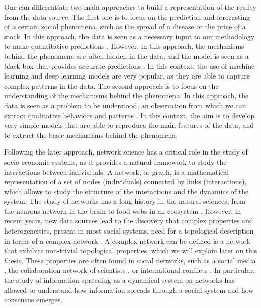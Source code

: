 One can differentiate two main approaches to build a representation of the reality from the data source. The first one is to focus on the prediction and forecasting of a certain social phenomena, such as the spread of a disease or the price of a stock. In this approach, the data is seen as a necessary input to our methodology to make quantitative predictions \cite{lazer-2009}. However, in this approach, the mechanisms behind the phenomena are often hidden in the data, and the model is seen as a black box that provides accurate predictions \cite{rudin-2019}. In this context, the use of machine learning \cite{murphy-2012} and deep learning \cite{goodfellow-2016} models are  very popular, as they are able to capture complex patterns in the data. The second approach is to focus on the understanding of the mechanisms behind the phenomena. In this approach, the data is seen as a problem to be understood, an observation from which we can extract qualitative behaviors and patterns \cite{axelrod-1997}. In this context, the aim is to develop very simple models that are able to reproduce the main features of the data, and to extract the basic mechanisms behind the phenomena.

Following the later approach, network science has a critical role in the study of socio-economic systems, as it provides a natural framework to study the interactions between individuals. A network, or graph, is a mathematical representation of a set of nodes (individuals) connected by links (interactions), which allows to study the structure of the interactions and the dynamics of the system. The study of networks has a long history in the natural sciences, from the neurons network in the brain \cite{sporns-2004} to food webs in an ecosystem \cite{ings-2008, elith-2009, bastolla-2009}. However, in recent years, new data sources lead to the discovery that complex properties and heterogeneities, present in most social systems, need for a topological description in terms of a complex network \cite{newman-book, dorogovtsev2002evolution, kilduff2003social}. A complex network can be defined is a network that exhibits non-trivial topological properties, which we will explain later on this thesis. These properties are often found in social networks, such as a social media \cite{dunbar-2015}, the collaboration network of scientists \cite{newman-coll-2001,radicchi-2008}, or international conflicts \cite{hafnerburton-2009, diaz2023network}. In particular, the study of information spreading as a dynamical system on networks has allowed to understand how information spreads through a social system and how consensus emerges.

